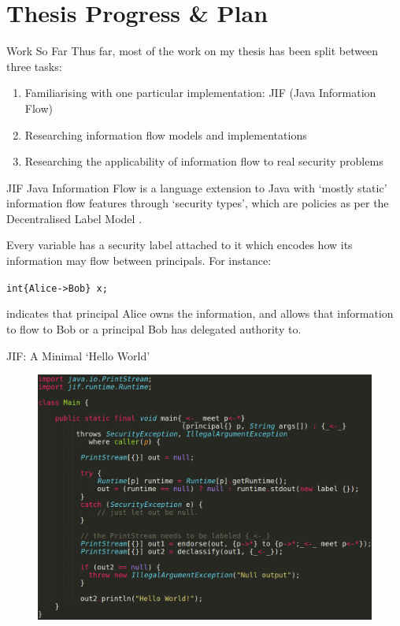 \section{Thesis Progress \& Plan}

\begin{frame}{Work So Far}
	Thus far, most of the work on my thesis has been split between three tasks:
	
	\begin{enumerate}
		\item Familiarising with one particular implementation: JIF (Java Information Flow)
		\item Researching information flow models and implementations
		\item Researching the applicability of information flow to real security problems
	\end{enumerate}
\end{frame}

\begin{frame}{JIF}
	Java Information Flow is a language extension to Java with `mostly static' information flow features through `security types', which are policies as per the Decentralised Label Model \cite{work:myersdlm}.
	
	Every variable has a security label attached to it which encodes how its information may flow between principals. For instance:
	
	\texttt{int\{Alice->Bob\} x;}
	
	indicates that principal Alice owns the information, and allows that information to flow to Bob or a principal Bob has delegated authority to.
\end{frame}

\begin{frame}{JIF: A Minimal `Hello World'}
	\begin{figure}
		\includegraphics[width=\linewidth]{content/images/jif_helloworld.png}
	\end{figure}
\end{frame}

